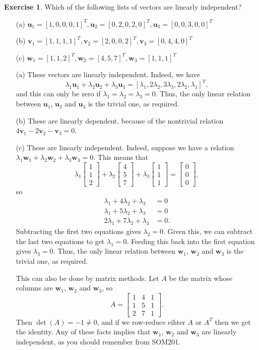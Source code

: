 \documentclass{amsart}
\newcommand{\bsm}       {\left[\begin{smallmatrix}}
\newcommand{\esm}       {\end{smallmatrix}\right]}
\newcommand{\lm}        {\lambda}
\newcommand{\vu}        {\mathbf{u}}
\newcommand{\vv}        {\mathbf{v}}
\newcommand{\vw}        {\mathbf{w}}
\renewcommand{\:}       {\colon}
\theoremstyle{definition}
\newtheorem{exercise}{Exercise}[section]
\renewenvironment{solution}{\SolutionAtEnd}{\endSolutionAtEnd}
\begin{document}
\begin{exercise}
 Which of the following lists of vectors are linearly
 independent?\\[0.1ex]
 \begin{itemize}\renewcommand{\itemsep}{1ex}
  \item[(a)]
   $\vu_1=[1,0,0,0,1]^T,\vu_2=[0,2,0,2,0]^T,\vu_3=[0,0,3,0,0]^T$
  \item[(b)]
   $\vv_1=[1,1,1,1]^T,\vv_2=[2,0,0,2]^T,\vv_3=[0,4,4,0]^T$
  \item[(c)]
   $\vw_1=[1,1,2]^T,\vw_2=[4,5,7]^T,\vw_3=[1,1,1]^T$ 
 \end{itemize}
\end{exercise}
\begin{solution}
 \begin{itemize}
  \item[(a)] These vectors are linearly independent.
   Indeed, we have 
   \[ \lm_1\vu_1+\lm_2\vu_2+\lm_3\vu_3 =
       [\lm_1,2\lm_2,3\lm_3,2\lm_2,\lm_1]^T, 
   \]
   and this can only be zero if $\lm_1=\lm_2=\lm_3=0$.
   Thus, the only linear relation between $\vu_1$, $\vu_2$
   and $\vu_3$ is the trivial one, as required.
  \item[(b)] These are linearly dependent, because of the
   nontrivial relation $4\vv_1-2\vv_2-\vv_3=0$.
  \item[(c)] These are linearly independent.  Indeed,
   suppose we have a relation
   $\lm_1\vw_1+\lm_2\vw_2+\lm_3\vw_3=0$.  This means that 
   \[ \lm_1\bsm 1\\1\\2\esm + 
      \lm_2\bsm 4\\5\\7\esm +
      \lm_3\bsm 1\\1\\1\esm = \bsm 0\\0\\0\esm ,
   \]
   so
   \begin{align*}
    \lm_1 + 4\lm_2 + \lm_3  &= 0 \\
    \lm_1 + 5\lm_2 + \lm_3  &= 0 \\
    2\lm_1 + 7\lm_2 + \lm_3 &= 0.
   \end{align*}
   Subtracting the first two equations gives $\lm_2=0$.
   Given this, we can subtract the last two equations to get
   $\lm_1=0$.  Feeding this back into the first equation
   gives $\lm_3=0$.  Thus, the only linear relation between
   $\vw_1$, $\vw_2$ and $\vw_3$ is the trivial one, as
   required.  

   This can also be done by matrix methods.  Let $A$ be the
   matrix whose columns are $\vw_1$, $\vw_2$ and $\vw_3$, so
   \[ A = \bsm 1 & 4 & 1 \\ 1 & 5 & 1 \\ 2 & 7 & 1 \esm. \]
   Then $\det(A)=-1\neq 0$, and if we row-reduce eihter $A$
   or $A^T$ then we get the identity.  Any of these facts
   implies that $\vw_1$, $\vw_2$ and $\vw_3$ are linearly
   independent, as you should remember from SOM201.
 \end{itemize}
\end{solution}
\end{document}
